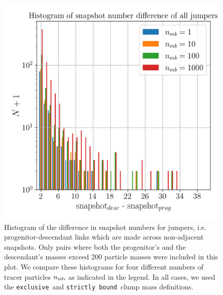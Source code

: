\documentclass[a4paper,twocolumn,fleqn,usenatbib]{mnras}
\newcommand{\exc}{\texttt{exclusive}}
\newcommand{\sad}{\texttt{strictly bound}}
\begin{document}
\begin{figure}
  \centering
  \includegraphics[width=.9\linewidth, keepaspectratio]{images/tree-statistics-my-threshold/jumper_distance-ntrace.png}%
  \caption{ Histogram of the difference in snapshot numbers for
    jumpers, i.e.  progenitor-descendant links which are made across
    non-adjacent snapshots.  Only pairs where both the progenitor's
    and the descendant's masses exceed 200 particle masses were
    included in this plot.  We compare these histograms for four
    different numbers of tracer particles $n_{\rm mb}$ as indicated in
    the legend.  In all cases, we used the \exc\ and \sad\ clump mass
    definitions.
  }%
  \label{fig:jumper-distances}
\end{figure}
\end{document}
